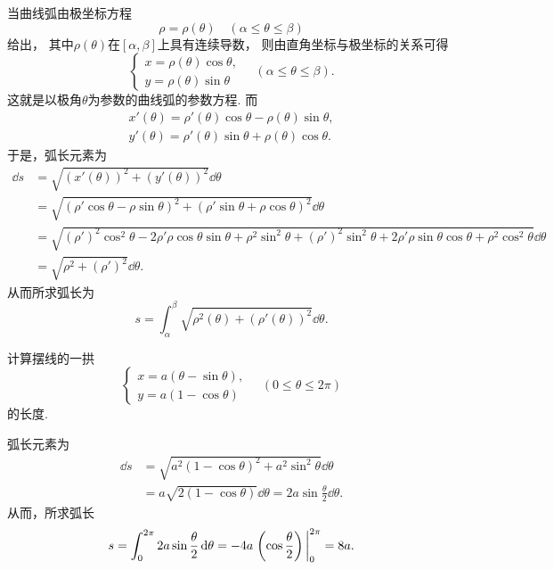 当曲线弧由极坐标方程\[
	\rho=\rho(\theta)
	\quad(\alpha \leq \theta \leq \beta)
\]给出，
其中\(\rho(\theta)\)在\([\alpha,\beta]\)上具有连续导数，
则由直角坐标与极坐标的关系可得\[
	\left\{ \begin{array}{c}
		x = \rho(\theta) \cos\theta, \\
		y = \rho(\theta) \sin\theta
	\end{array} \right.
	\quad(\alpha \leq \theta \leq \beta).
\]
这就是以极角\(\theta\)为参数的曲线弧的参数方程.
而\begin{gather*}
	x'(\theta) = \rho'(\theta) \cos\theta - \rho(\theta) \sin\theta, \\
	y'(\theta) = \rho'(\theta) \sin\theta + \rho(\theta) \cos\theta.
\end{gather*}
于是，弧长元素为\begin{align*}
	\dd{s}
	&= \sqrt{(x'(\theta))^2 + (y'(\theta))^2} \dd{\theta} \\
	&= \sqrt{(\rho' \cos\theta - \rho \sin\theta)^2
		+ (\rho' \sin\theta + \rho \cos\theta)^2} \dd{\theta} \\
	&= \sqrt{(\rho')^2\cos^2\theta-2\rho'\rho\cos\theta\sin\theta+\rho^2\sin^2\theta
		+ (\rho')^2\sin^2\theta+2\rho'\rho\sin\theta\cos\theta+\rho^2\cos^2\theta} \dd{\theta} \\
	&= \sqrt{\rho^2 + (\rho')^2} \dd{\theta}.
\end{align*}
从而所求弧长为\begin{equation}
	s = \int_\alpha^\beta \sqrt{\rho^2(\theta) + (\rho'(\theta))^2} \dd{\theta}.
\end{equation}

\begin{example}
计算摆线的一拱\[
	\left\{ \begin{array}{l}
		x = a (\theta - \sin\theta), \\
		y = a (1 - \cos\theta)
	\end{array} \right.
	\quad(0 \leq \theta \leq 2\pi)
\]的长度.
\begin{solution}
弧长元素为\begin{align*}
	\dd{s} &= \sqrt{a^2 (1 - \cos\theta)^2 + a^2 \sin^2\theta} \dd{\theta} \\
	&= a \sqrt{2 (1 - \cos\theta)} \dd{\theta}
	= 2 a \sin\frac\theta2 \dd{\theta}.
\end{align*}
从而，所求弧长\[
	s = \int_0^{2\pi} 2a \sin\frac\theta2 \dd{\theta}
	= -4a \eval{\left(\cos\frac\theta2\right)}_0^{2\pi}
	= 8a.
\]
\end{solution}
\end{example}

